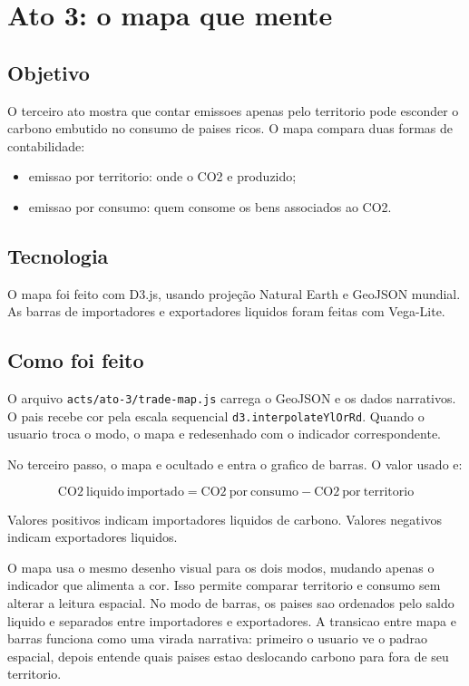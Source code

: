 \documentclass[12pt,a4paper]{article}
\begin{document}
\section{Ato 3: o mapa que mente}

\subsection{Objetivo}

O terceiro ato mostra que contar emissoes apenas pelo territorio pode esconder o carbono embutido no consumo de paises ricos. O mapa compara duas formas de contabilidade:

\begin{itemize}
  \item emissao por territorio: onde o CO2 e produzido;
  \item emissao por consumo: quem consome os bens associados ao CO2.
\end{itemize}

\subsection{Tecnologia}

O mapa foi feito com D3.js, usando projeção Natural Earth e GeoJSON mundial. As barras de importadores e exportadores liquidos foram feitas com Vega-Lite.

\subsection{Como foi feito}

O arquivo \texttt{acts/ato-3/trade-map.js} carrega o GeoJSON e os dados narrativos. O pais recebe cor pela escala sequencial \texttt{d3.interpolateYlOrRd}. Quando o usuario troca o modo, o mapa e redesenhado com o indicador correspondente.

No terceiro passo, o mapa e ocultado e entra o grafico de barras. O valor usado e:

\[
\mathrm{CO2\ liquido\ importado} = \mathrm{CO2\ por\ consumo} - \mathrm{CO2\ por\ territorio}
\]

Valores positivos indicam importadores liquidos de carbono. Valores negativos indicam exportadores liquidos.

O mapa usa o mesmo desenho visual para os dois modos, mudando apenas o indicador que alimenta a cor. Isso permite comparar territorio e consumo sem alterar a leitura espacial. No modo de barras, os paises sao ordenados pelo saldo liquido e separados entre importadores e exportadores. A transicao entre mapa e barras funciona como uma virada narrativa: primeiro o usuario ve o padrao espacial, depois entende quais paises estao deslocando carbono para fora de seu territorio.
\end{document}
